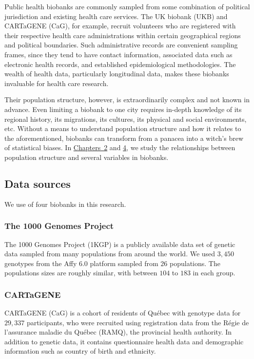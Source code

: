 Public health biobanks are commonly sampled from some combination of political jurisdiction and existing health care services. The UK biobank (UKB) and CARTaGENE (CaG), for example, recruit volunteers who are registered with their respective health care administrations within certain geographical regions and political boundaries\citep{sudlow_uk_2015}\citep{awadalla_cohort_2013}. Such administrative records are convenient sampling frames, since they tend to have contact information, associated data such as electronic health records, and established epidemiological methodologies. The wealth of health data, particularly longitudinal data, makes these biobanks invaluable for health care research. 

Their population structure, however, is extraordinarily complex and not known in advance. Even limiting a biobank to one city requires in-depth knowledge of its regional history, its migrations, its cultures, its physical and social environments, etc. Without a means to understand population structure and how it relates to the aforementioned, biobanks can transform from a panacea into a witch's brew of statistical biases. In \hyperref[chap:chapter2]{Chapters~2} and \hyperref[chap:chapter4]{4}, we study the relationships between population structure and several variables in biobanks.

\subsection{Data sources}

We use of four biobanks in this research.

\subsubsection{The 1000 Genomes Project}

The 1000 Genomes Project (1KGP) is a publicly available data set of genetic data sampled from many populations from around the world\citep{global_2015}. We used $3,450$ genotypes from the Affy 6.0 platform sampled from $26$  populations. The populations sizes are roughly similar, with between $104$ to $183$ in each group.

\subsubsection{CARTaGENE}

CARTaGENE (CaG) is a cohort of residents of Qu\'{e}bec with genotype data for $29,337$ participants, who were recruited using registration data from the R\'{e}gie de l’assurance maladie du Qu\'{e}bec (RAMQ), the provincial health authority\citep{awadalla_cohort_2013}. In addition to genetic data, it contains questionnaire health data and demographic information such as country of birth and ethnicity.

